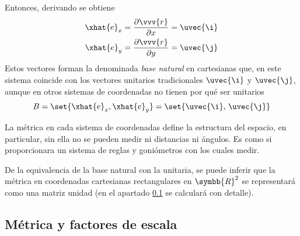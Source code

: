 Entonces, derivando se obtiene
\begin{subequations}
  \begin{align}\label{eq:R2-cart-ex}
    \xhat{e}_x
    &=
      \dfrac{\partial\vvv{r}}{\partial x}
      = \uvec{\i}\\
    \label{eq:R2-cart-ey}
    \xhat{e}_y
    &= \dfrac{\partial\vvv{r}}{\partial y}
      = \uvec{\j}
  \end{align}
\end{subequations}
Estos vectores forman la denominada \emph{base natural} en cartesianas que, en este
sistema coincide con los vectores unitarios tradicionales $\uvec{\i}$ y $\uvec{\j}$,
aunque en otros sistemas de coordenadas no tienen por qué ser unitarios
\begin{equation}\label{eq:R2-cart-base}
  B=\set{\xhat{e}_x, \xhat{e}_y} = \set{\uvec{\i},\, \uvec{\j}}
\end{equation}

La métrica en cada sistema de coordenadas define la estructura del espacio, en
particular, sin ella no se pueden medir ni distancias ni ángulos. Es como si
proporcionara un sistema de reglas y goniómetros con los cuales medir.

De la equivalencia de la base natural con la unitaria, se puede inferir que la métrica en
coordenadas cartesianas rectangulares en $\symbb{R}^2$ se representará como una matriz
unidad (en el apartado \ref{ssect:R2-cart-metrica-factores_escala} se calculará con detalle).

\subsection{Métrica y factores de escala}
\label{ssect:R2-cart-metrica-factores_escala}

